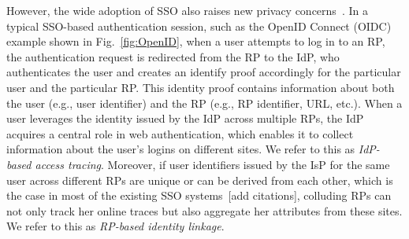 However, the wide adoption of SSO also raises new privacy concerns~\cite{NIST2017draft,persona,SPRESSO}. In a typical SSO-based authentication session, such as the OpenID Connect (OIDC) example shown in Fig.~\ref{fig:OpenID}, when a user attempts to log in to an RP, the authentication request is redirected from the RP to the IdP, who authenticates the user and creates an identify proof accordingly for the particular user and the particular RP. This identity proof contains information about both the user (e.g., user identifier) and the RP (e.g., RP identifier, URL, etc.). When a user leverages the identity issued by the IdP across multiple RPs, the IdP acquires a central role in web authentication, which enables it to collect information about the user's logins on different sites. We refer to this as {\em IdP-based access tracing}. Moreover, if user identifiers issued by the IsP for the same user across different RPs are unique or can be derived from each other, which is the case in most of the existing SSO systems~[add citations], colluding RPs can not only track her online traces but also aggregate her attributes from these sites. We refer to this as {\em RP-based identity linkage}.



